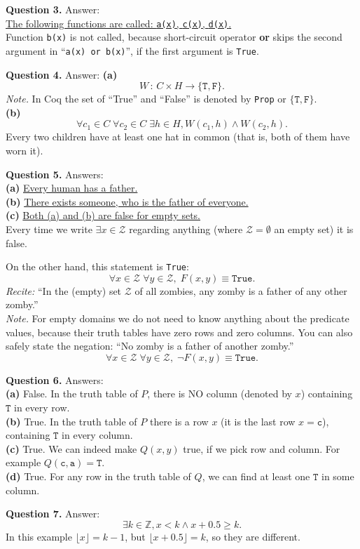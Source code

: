\documentclass[jou]{apa6}
\begin{document}
\vspace{10pt}
{\bf Question 3.} Answer:\\
\underline{The following functions are called: {\tt a(x)}, 
{\tt c(x)}, {\tt d(x)}.}\\
Function {\tt b(x)} is not called, because 
short-circuit operator {\bf or} 
skips the second argument in ``{\tt a(x) or b(x)}'', 
if the first argument is {\tt True}.







\vspace{10pt}
{\bf Question 4.} Answer: {\bf (a)}
$$\boxed{W\,:\,C \times H \rightarrow \{ \mathtt{T}, \mathtt{F} \}.}$$
{\em Note.} In Coq the set of ``True'' and ``False'' 
is denoted by {\tt Prop} or $\{ \mathtt{T}, \mathtt{F} \}$.\\
{\bf (b)} 
$$\boxed{\forall c_1 \in C \; \forall c_2 \in C \; \exists h \in H,
W(c_1,h) \wedge W(c_2,h).}$$
Every two
children have at least one hat in common (that is, both
of them have worn it).



\vspace{10pt}
{\bf Question 5.} Answers:\\
{\bf (a)} \underline{Every human has a father.}\\
{\bf (b)} \underline{There exists someone, who is the father of everyone.}\\
{\bf (c)} \underline{Both (a) and (b) are false for empty sets.}\\
Every time we write $\exists x \in \mathcal{Z}$
regarding anything (where $\mathcal{Z} = \emptyset$ \textendash{}
an empty set) it is false. 

On the other hand, this statement is {\tt True}: 
$$\forall x \in \mathcal{Z} \; \forall y \in \mathcal{Z},\; F(x,y) \equiv \mathtt{True}.$$
{\em Recite:} ``In the (empty) set $\mathcal{Z}$ of all 
zombies, any zomby is a father of any other zomby.''\\
{\em Note.} For empty domains we do not need to know anything 
about the predicate values, because their truth tables have
zero rows and zero columns. You can also safely state the negation:
``No zomby is a father of another zomby.''
$$\forall x \in \mathcal{Z} \; \forall y \in \mathcal{Z},\; \neg F(x,y) \equiv \mathtt{True}.$$


\vspace{10pt}
{\bf Question 6.} Answers:\\
{\bf (a)} False. In the truth table of $P$, there is NO 
column (denoted by $x$) containing $\mathtt{T}$ in 
every row.\\
{\bf (b)} True. In the truth table of $P$ there is a row $x$ 
(it is the last row $x = \mathtt{c}$), containing
$\mathtt{T}$ in every column.\\
{\bf (c)} True. We can indeed make $Q(x,y)$ true, if we pick 
row and column. For example $Q(\mathtt{c},\mathtt{a}) = \mathtt{T}$.\\
{\bf (d)} True. For any row in the truth table of $Q$, 
we can find at least one $\mathtt{T}$ in some column. 


\vspace{10pt}
{\bf Question 7.} Answer:\\
$$\exists k \in \mathbb{Z}, x < k \wedge x+0.5 \geq k.$$
In this example $\lfloor x \rfloor = k-1$, but
$\lfloor x+0.5 \rfloor = k$, so they are different.
\end{document}
